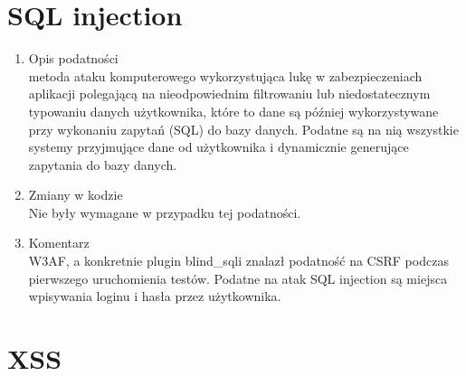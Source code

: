 
\section{SQL injection}
\begin{enumerate}
\item Opis podatności\\
 metoda ataku komputerowego wykorzystująca lukę w zabezpieczeniach aplikacji polegającą na nieodpowiednim filtrowaniu lub niedostatecznym typowaniu danych użytkownika, które to dane są później wykorzystywane przy wykonaniu zapytań (SQL) do bazy danych. Podatne są na nią wszystkie systemy przyjmujące dane od użytkownika i dynamicznie generujące zapytania do bazy danych.
\item Zmiany w kodzie\\
Nie były wymagane w przypadku tej podatności.
\item Komentarz\\
W3AF, a konkretnie plugin blind\_sqli znalazł podatność na CSRF podczas pierwszego uruchomienia testów. Podatne na atak SQL injection są miejsca wpisywania loginu i hasła przez użytkownika.
\noindent
\begin{minipage}{\linewidth}
\label{erd}
\end{minipage}
\end{enumerate}

\section{XSS}

